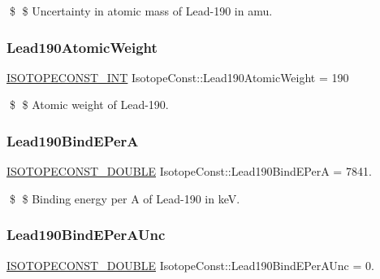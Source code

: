 \$ \$ Uncertainty in atomic mass of Lead-\/190 in amu. \mbox{\label{group___isotope_const-_lead-_pb190_ga58e18ba8c94ab1d792b5a43f660171c0}} 
\subsubsection{\texorpdfstring{Lead190\+Atomic\+Weight}{Lead190AtomicWeight}}
{\footnotesize\ttfamily \mbox{\hyperlink{group___isotope_const-_macros_ga5f18360b3e99483a35c32d789e62621c}{I\+S\+O\+T\+O\+P\+E\+C\+O\+N\+S\+T\+\_\+\+I\+NT}} Isotope\+Const\+::\+Lead190\+Atomic\+Weight = 190}

\$ \$ Atomic weight of Lead-\/190. \mbox{\label{group___isotope_const-_lead-_pb190_ga51582606c532e7752837a0907ca89da2}} 
\subsubsection{\texorpdfstring{Lead190\+Bind\+E\+PerA}{Lead190BindEPerA}}
{\footnotesize\ttfamily \mbox{\hyperlink{group___isotope_const-_macros_ga8f45a7272ce02c0b4c65c44636ed719a}{I\+S\+O\+T\+O\+P\+E\+C\+O\+N\+S\+T\+\_\+\+D\+O\+U\+B\+LE}} Isotope\+Const\+::\+Lead190\+Bind\+E\+PerA = 7841.}

\$ \$ Binding energy per A of Lead-\/190 in keV. \mbox{\label{group___isotope_const-_lead-_pb190_ga70e1d061c2c76494687b195dfb6c9310}} 
\subsubsection{\texorpdfstring{Lead190\+Bind\+E\+Per\+A\+Unc}{Lead190BindEPerAUnc}}
{\footnotesize\ttfamily \mbox{\hyperlink{group___isotope_const-_macros_ga8f45a7272ce02c0b4c65c44636ed719a}{I\+S\+O\+T\+O\+P\+E\+C\+O\+N\+S\+T\+\_\+\+D\+O\+U\+B\+LE}} Isotope\+Const\+::\+Lead190\+Bind\+E\+Per\+A\+Unc = 0.}


